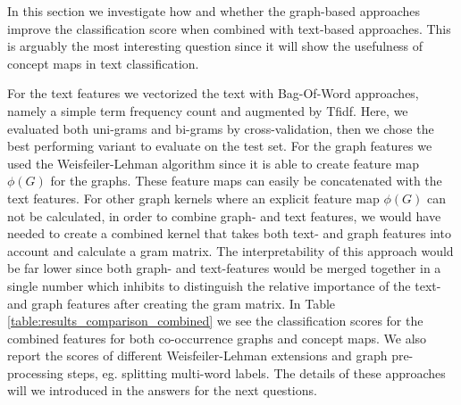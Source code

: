 In this section we investigate how and whether the graph-based approaches improve the classification score when combined with text-based approaches.
This is arguably the most interesting question since it will show the usefulness of concept maps in text classification.

For the text features we vectorized the text with Bag-Of-Word approaches, namely a simple term frequency count and augmented by Tfidf.
Here, we evaluated both uni-grams and bi-grams by cross-validation, then we chose the best performing variant to evaluate on the test set.
For the graph features we used the Weisfeiler-Lehman algorithm since it is able to create feature map $\phi(G)$ for the graphs.
These feature maps can easily be concatenated with the text features.
For other graph kernels where an explicit feature map $\phi(G)$ can not be calculated, in order to combine graph- and text features, we would have needed to create a combined kernel that takes both text- and graph features into account and calculate a gram matrix.
The interpretability of this approach would be far lower since both graph- and text-features would be merged together in a single number which inhibits to distinguish the relative importance of the text- and graph features after creating the gram matrix.
In Table \ref{table:results_comparison_combined} we see the classification scores for the combined features for both co-occurrence graphs and concept maps.
We also report the scores of different Weisfeiler-Lehman extensions and graph pre-processing steps, eg. splitting multi-word labels.
The details of these approaches will we introduced in the answers for the next questions.

